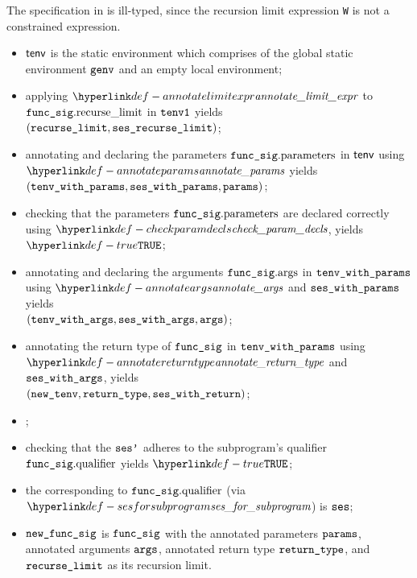 The specification in  is ill-typed, since the recursion limit expression \verb|W|
is not a constrained expression.

\ProseParagraph
\AllApply
\begin{itemize}
  \item $\textsf{tenv}$ is the static environment which comprises of the global static environment $\texttt{genv}$ and an empty local environment;
  \item applying $\annotatelimitexpr$ to $\texttt{func\_sig}.\text{recurse\_limit}$ in $\texttt{tenv1}$ yields \\
        $(\texttt{recurse\_limit}, \texttt{ses\_recurse\_limit})$\ProseOrTypeError;
  \item annotating and declaring the parameters $\texttt{func\_sig}.\text{parameters}$ in $\textsf{tenv}$ using \\
        $\annotateparams$ yields $(\texttt{tenv\_with\_params}, \texttt{ses\_with\_params}, \texttt{params})$\ProseOrTypeError;
  \item checking that the parameters $\texttt{func\_sig}.\text{parameters}$ are declared correctly using $\checkparamdecls$, yields $\True$\ProseOrTypeError;
  \item annotating and declaring the arguments $\texttt{func\_sig}.\text{args}$ in $\texttt{tenv\_with\_params}$ using $\annotateargs$
        and $\texttt{ses\_with\_params}$ yields\\
        $(\texttt{tenv\_with\_args}, \texttt{ses\_with\_args}, \texttt{args})$\ProseOrTypeError;
  \item annotating the return type of $\texttt{func\_sig}$ in $\texttt{tenv\_with\_params}$ using \\ $\annotatereturntype$ and $\texttt{ses\_with\_args}$, yields\\
        $(\texttt{new\_tenv}, \texttt{return\_type}, \texttt{ses\_with\_return})$\ProseOrTypeError;
  \item {};
  \item checking that the \sideeffectsetterm{} $\texttt{ses'}$ adheres to the subprogram's \purity{} qualifier $\texttt{func\_sig}.\text{qualifier}$ yields $\True$\ProseOrTypeError;
  \item the \sideeffectsetterm{} corresponding to $\texttt{func\_sig}.\text{qualifier}$ (via $\sesforsubprogram$) is $\texttt{ses}$;
  \item $\texttt{new\_func\_sig}$ is $\texttt{func\_sig}$ with the annotated parameters $\texttt{params}$, annotated arguments $\texttt{args}$, annotated return type $\texttt{return\_type}$,
        and $\texttt{recurse\_limit}$ as its recursion limit.
\end{itemize}

